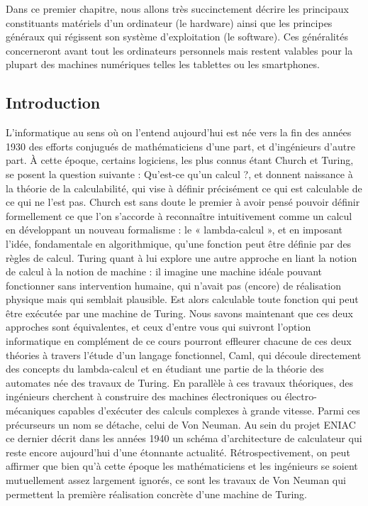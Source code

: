 
Dans ce premier chapitre, nous allons très succinctement décrire les principaux constituants matériels d’un
ordinateur (le hardware) ainsi que les principes généraux qui régissent son système d’exploitation (le software).
Ces généralités concerneront avant tout les ordinateurs personnels mais restent valables pour la plupart des
machines numériques telles les tablettes ou les smartphones.

\subsection{Introduction}

L’informatique au sens où on l’entend aujourd’hui est née vers la fin des années 1930 des efforts conjugués de
mathématiciens d’une part, et d’ingénieurs d’autre part.
À cette époque, certains logiciens, les plus connus étant Church et Turing, se posent la question suivante :
Qu’est-ce qu’un calcul ?, et donnent naissance à la théorie de la calculabilité, qui vise à définir précisément
ce qui est calculable de ce qui ne l’est pas. Church est sans doute le premier à avoir pensé pouvoir définir
formellement ce que l’on s’accorde à reconnaître intuitivement comme un calcul en développant un nouveau
formalisme : le « lambda-calcul », et en imposant l’idée, fondamentale en algorithmique, qu’une fonction peut
être définie par des règles de calcul.
Turing quant à lui explore une autre approche en liant la notion de calcul à la notion de machine : il imagine
une machine idéale pouvant fonctionner sans intervention humaine, qui n’avait pas (encore) de réalisation
physique mais qui semblait plausible. Est alors calculable toute fonction qui peut être exécutée par une machine
de Turing. Nous savons maintenant que ces deux approches sont équivalentes, et ceux d’entre vous qui suivront
l’option informatique en complément de ce cours pourront effleurer chacune de ces deux théories à travers
l’étude d’un langage fonctionnel, Caml, qui découle directement des concepts du lambda-calcul et en étudiant
une partie de la théorie des automates née des travaux de Turing.
En parallèle à ces travaux théoriques, des ingénieurs cherchent à construire des machines électroniques ou
électro-mécaniques capables d’exécuter des calculs complexes à grande vitesse. Parmi ces précurseurs un nom
se détache, celui de Von Neuman. Au sein du projet ENIAC ce dernier décrit dans les années 1940 un schéma
d’architecture de calculateur qui reste encore aujourd’hui d’une étonnante actualité. Rétrospectivement, on
peut affirmer que bien qu’à cette époque les mathématiciens et les ingénieurs se soient mutuellement assez
largement ignorés, ce sont les travaux de Von Neuman qui permettent la première réalisation concrète d’une
machine de Turing.
